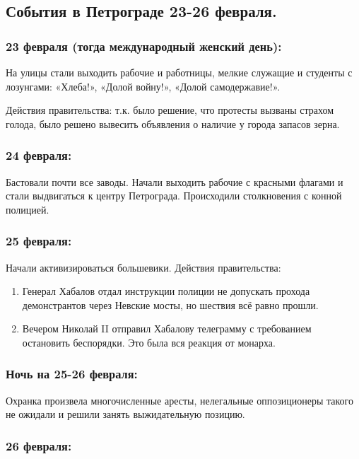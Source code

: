 \subsection{События в Петрограде 23-26 февраля.}

\subsubsection{\textbf{23 февраля (тогда международный женский день):}}

На улицы стали выходить рабочие и работницы, мелкие служащие и студенты с лозунгами: «Хлеба!», «Долой войну!», «Долой самодержавие!».

Действия правительства: т.к. было решение, что протесты вызваны страхом голода, было решено вывесить объявления о наличие у города запасов зерна.

\subsubsection{\textbf{24 февраля:}}

Бастовали почти все заводы. Начали выходить рабочие с красными флагами и стали выдвигаться к центру Петрограда. Происходили столкновения с конной полицией.

\subsubsection{\textbf{25 февраля:}}

Начали активизироваться большевики.
Действия правительства:

\begin{enumerate}
    \item Генерал Хабалов отдал инструкции полиции не допускать прохода демонстрантов через Невские мосты, но шествия всё равно прошли.
    \item Вечером Николай II отправил Хабалову телеграмму с требованием остановить беспорядки. Это была вся реакция от монарха.
\end{enumerate}

\subsubsection{\textbf{Ночь на 25-26 февраля:}}

Охранка произвела многочисленные аресты, нелегальные оппозиционеры такого не ожидали и решили занять выжидательную позицию.

\subsubsection{\textbf{26 февраля:}}

